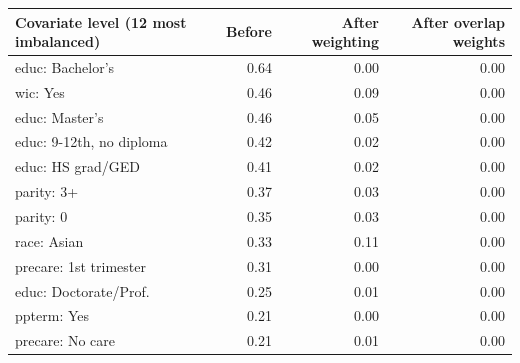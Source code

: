 {\small
\begin{tabular}{lrrr}
\toprule
Covariate level (12 most imbalanced) & Before & After weighting & After overlap weights \\
\midrule
educ: Bachelor's & 0.64 & 0.00 & 0.00 \\
wic: Yes & 0.46 & 0.09 & 0.00 \\
educ: Master's & 0.46 & 0.05 & 0.00 \\
educ: 9-12th, no diploma & 0.42 & 0.02 & 0.00 \\
educ: HS grad/GED & 0.41 & 0.02 & 0.00 \\
parity: 3+ & 0.37 & 0.03 & 0.00 \\
parity: 0 & 0.35 & 0.03 & 0.00 \\
race: Asian & 0.33 & 0.11 & 0.00 \\
precare: 1st trimester & 0.31 & 0.00 & 0.00 \\
educ: Doctorate/Prof. & 0.25 & 0.01 & 0.00 \\
ppterm: Yes & 0.21 & 0.00 & 0.00 \\
precare: No care & 0.21 & 0.01 & 0.00 \\
\bottomrule
\end{tabular}
}
